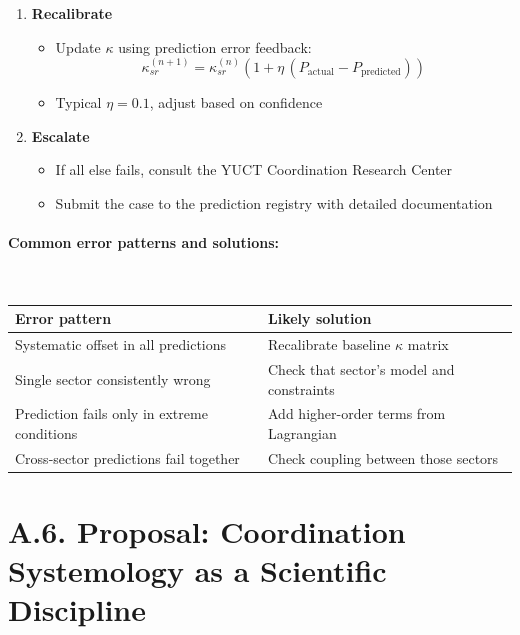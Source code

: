 \documentclass[13pt,a4paper]{article}
\begin{document}
\begin{enumerate}
		\item \textbf{Recalibrate}
		\begin{itemize}
			\item Update \(\kappa\) using prediction error feedback:
			\[
			\kappa_{sr}^{(n+1)} = \kappa_{sr}^{(n)}\left(1+\eta\,(P_{\mathrm{actual}}-P_{\mathrm{predicted}})\right)
			\]
			\item Typical \(\eta = 0.1\), adjust based on confidence
		\end{itemize}
		
		\item \textbf{Escalate}
		\begin{itemize}
			\item If all else fails, consult the YUCT Coordination Research Center
			\item Submit the case to the prediction registry with detailed documentation
		\end{itemize}
	\end{enumerate}
	
	\paragraph*{Common error patterns and solutions:} \
	
	\begin{tabularx}{\textwidth}{|l|X|}
		\hline
		\textbf{Error pattern} & \textbf{Likely solution} \\
		\hline
		Systematic offset in all predictions & Recalibrate baseline \(\kappa\) matrix \\
		\hline
		Single sector consistently wrong & Check that sector's model and constraints \\
		\hline
		Prediction fails only in extreme conditions & Add higher-order terms from Lagrangian \\
		\hline
		Cross-sector predictions fail together & Check coupling between those sectors \\
		\hline
	\end{tabularx}
	


	\section*{A.6. Proposal: Coordination Systemology as a Scientific Discipline}
	
\end{document}
